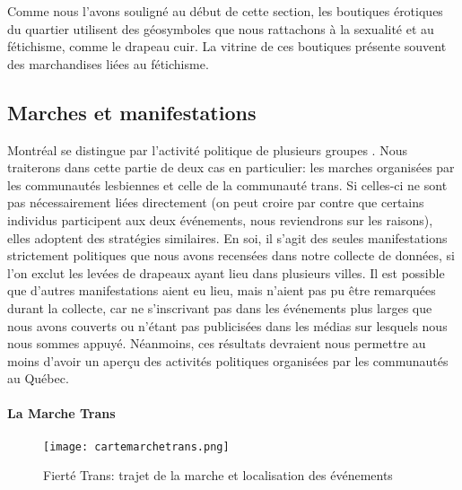 Comme nous l'avons souligné au début de cette section, les boutiques érotiques du quartier utilisent des géosymboles que nous rattachons à la sexualité et au fétichisme, comme le drapeau cuir.
La vitrine de ces boutiques présente souvent des marchandises liées au fétichisme.

\subsection{Marches et manifestations}
\label{subsec:label}

Montréal se distingue par l'activité politique de plusieurs groupes \lgbt{}.
Nous traiterons dans cette partie de deux cas en particulier: les marches organisées par les communautés lesbiennes et celle de la communauté trans.
Si celles-ci ne sont pas nécessairement liées directement (on peut croire par contre que certains individus participent aux deux événements, nous reviendrons sur les raisons), elles adoptent des stratégies similaires.
En soi, il s'agit des seules manifestations strictement politiques que nous avons recensées dans notre collecte de données, si l'on exclut les levées de drapeaux ayant lieu dans plusieurs villes.
Il est possible que d'autres manifestations aient eu lieu, mais n'aient pas pu être remarquées durant la collecte, car ne s'inscrivant pas dans les événements plus larges que nous avons couverts ou n'étant pas publicisées dans les médias sur lesquels nous nous sommes appuyé.
Néanmoins, ces résultats devraient nous permettre au moins d'avoir un aperçu des activités politiques organisées par les communautés \lgbt{} au Québec.

\paragraph{La Marche Trans}
\label{subsubsec:marchetrans}

\begin{figure}[ht]
 \centering
 \texttt{[image: cartemarchetrans.png]}
 \caption[Fierté Trans: trajet et événements]{Fierté Trans: trajet de la marche et localisation des événements}\label{fig:cartemarchetrans}
\end{figure}

